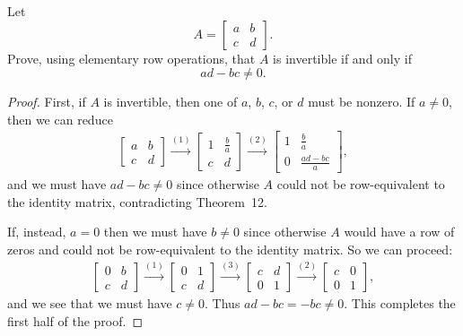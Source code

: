  Let
\begin{equation*}
  A =
  \begin{bmatrix}
    a & b \\
    c & d
  \end{bmatrix}.
\end{equation*}
Prove, using elementary row operations, that $A$ is invertible if and
only if
\begin{equation*}
  ad - bc \neq 0.
\end{equation*}
\begin{proof}
  First, if $A$ is invertible, then one of $a$, $b$, $c$, or $d$ must
  be nonzero. If $a\neq0$, then we can reduce
  \begin{gather*}
    \begin{bmatrix}
      a & b \\
      c & d
    \end{bmatrix}
    \xrightarrow{(1)}
    \begin{bmatrix}
      1 & \frac{b}a \\[3pt]
      c & d
    \end{bmatrix}
    \xrightarrow{(2)}
    \begin{bmatrix}
      1 & \frac{b}a \\[3pt]
      0 & \frac{ad-bc}a
    \end{bmatrix},
  \end{gather*}
  and we must have $ad - bc\neq0$ since otherwise $A$ could not be
  row-equivalent to the identity matrix, contradicting Theorem~12.

  If, instead, $a = 0$ then we must have $b\neq0$ since otherwise $A$
  would have a row of zeros and could not be row-equivalent to the
  identity matrix. So we can proceed:
  \begin{gather*}
    \begin{bmatrix}
      0 & b \\
      c & d
    \end{bmatrix}
    \xrightarrow{(1)}
    \begin{bmatrix}
      0 & 1 \\
      c & d
    \end{bmatrix}
    \xrightarrow{(3)}
    \begin{bmatrix}
      c & d \\
      0 & 1
    \end{bmatrix}
    \xrightarrow{(2)}
    \begin{bmatrix}
      c & 0 \\
      0 & 1
    \end{bmatrix},
  \end{gather*}
  and we see that we must have $c\neq0$. Thus $ad - bc =
  -bc\neq0$. This completes the first half of the proof.


\end{proof}
